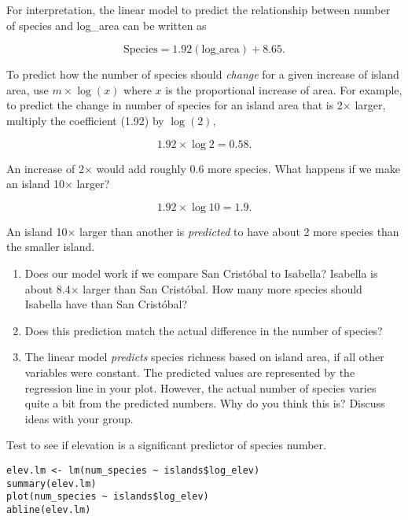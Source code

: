 \documentclass[11pt]{article}
\newcommand{\bigSpace}{\vspace{4\baselineskip}}
\begin{document}
For interpretation, the linear model to predict the relationship between number of species and log\_area can be written as

\[ \mathrm{Species} = 1.92\left(\mathrm{log\_area}\right) + 8.65.\]

To predict how the number of species should \emph{change} for a given  increase of island area, use $m \times \log(x)$ where $x$ is the proportional increase of area. For example, to predict the change in number of species for an island area that is 2$\times$ larger, multiply the coefficient (1.92) by $\log{(2)},$


 \[ 1.92 \times \log2 = 0.58.\]
 
An increase of 2$\times$ would add roughly 0.6 more species. What happens if we make an island 10$\times$ larger? 
 
 \[ 1.92 \times \log10 = 1.9.\]
 
An island 10$\times$ larger than another is \emph{predicted} to have about 2 more species than the smaller island.
 
\begin{enumerate}[resume]
\item Does our model work if we compare San Cristóbal to Isabella? Isabella is about 8.4$\times$ larger than San Cristóbal. How many more species should Isabella have than San Cristóbal?

\bigSpace
 
\item Does this prediction match the actual difference in the number of species? 
 
\bigSpace

 
\item The linear model \emph{predicts} species richness based on island area, if all other variables were constant. The predicted values are represented by the regression line in your plot.  However, the actual number of species varies quite a bit from the predicted numbers. Why do you think this is? Discuss ideas with your group.


\bigSpace

\end{enumerate}
 

Test to see if elevation is a significant predictor of species number.

\begin{verbatim}
elev.lm <- lm(num_species ~ islands$log_elev)
summary(elev.lm)
plot(num_species ~ islands$log_elev)
abline(elev.lm)
\end{verbatim}
\end{document}
